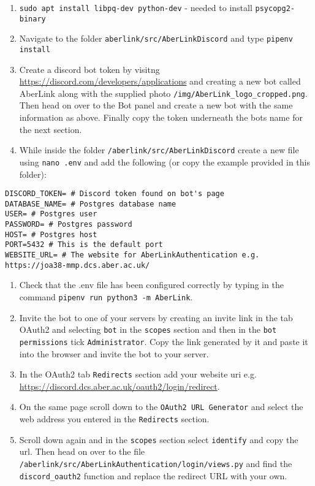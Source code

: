 \begin{enumerate}
\def\labelenumi{\arabic{enumi}.}
\item
  \texttt{sudo apt install libpq-dev python-dev} - needed to install
  \texttt{psycopg2-binary}
\item
  Navigate to the folder \texttt{aberlink/src/AberLinkDiscord} and type
  \texttt{pipenv install}
\item
  Create a discord bot token by visitng
  \url{https://discord.com/developers/applications} and creating a new
  bot called AberLink along with the supplied photo
  \texttt{/img/AberLink\_logo\_cropped.png}. Then head on over to the
  Bot panel and create a new bot with the same information as above.
  Finally copy the token underneath the bots name for the next section.
\item
  While inside the folder \texttt{/aberlink/src/AberLinkDiscord} create
  a new file using \texttt{nano .env} and add the following (or copy the
  example provided in this folder):
\end{enumerate}

\begin{lstlisting}
DISCORD_TOKEN= # Discord token found on bot's page
DATABASE_NAME= # Postgres database name
USER= # Postgres user
PASSWORD= # Postgres password
HOST= # Postgres host
PORT=5432 # This is the default port
WEBSITE_URL= # The website for AberLinkAuthentication e.g. https://joa38-mmp.dcs.aber.ac.uk/ 
\end{lstlisting}

\begin{enumerate}
\def\labelenumi{\arabic{enumi}.}
\setcounter{enumi}{4}
\item
  Check that the .env file has been configured correctly by typing in
  the command \texttt{pipenv run python3 -m AberLink}.
\item
  Invite the bot to one of your servers by creating an invite link in
  the tab OAuth2 and selecting \texttt{bot} in the \texttt{scopes}
  section and then in the \texttt{bot permissions} tick
  \texttt{Administrator}. Copy the link generated by it and paste it
  into the browser and invite the bot to your server.
\item
  In the OAuth2 tab \texttt{Redirects} section add your website uri e.g.
  \url{https://discord.dcs.aber.ac.uk/oauth2/login/redirect}.
\item
  On the same page scroll down to the \texttt{OAuth2 URL Generator} and
  select the web address you entered in the \texttt{Redirects} section.
\item
  Scroll down again and in the \texttt{scopes} section select
  \texttt{identify} and copy the url. Then head on over to the file
  \texttt{/aberlink/src/AberLinkAuthentication/login/views.py} and find
  the \texttt{discord\_oauth2} function and replace the redirect URL
  with your own.
\end{enumerate}

